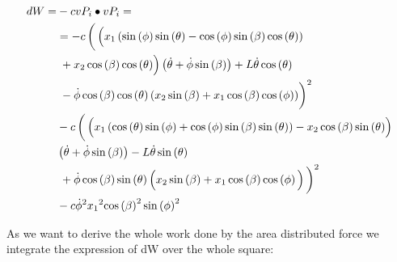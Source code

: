\begin{equation}
    \begin{split}
        dW = &-cvP_i\bullet vP_i = \\
        &= -c\left(\vphantom{\int}\left(\vphantom{\sum}x_{1}\left(\sin\left(\phi \right)\sin\left(\theta \right)-\cos\left(\phi \right)\sin\left(\beta \right)\cos\left(\theta \right)\right)\right.\right.\\
        &\left.\vphantom{\sum}+x_{2}\cos\left(\beta \right)\cos\left(\theta \right)\right)\left(\mathrm{\dot\theta}+\mathrm{\dot\phi}\sin\left(\beta \right)\right)+L\mathrm{\dot\theta}\cos\left(\theta \right)\\
        &\left.\vphantom{\int}-\mathrm{\dot\phi}\cos\left(\beta \right)\cos\left(\theta \right)\left(x_{2}\sin\left(\beta \right)+x_{1}\cos\left(\beta \right)\cos\left(\phi \right)\right)\right)^2\\
        &-c\left(\vphantom{\int}\left(\vphantom{\sum}x_{1}\left(\cos\left(\theta \right)\sin\left(\phi \right)+\cos\left(\phi \right)\sin\left(\beta \right)\sin\left(\theta \right)\right)-x_{2}\cos\left(\beta \right)\sin\left(\theta \right)\right)\right.\\
&\left(\mathrm{\dot\theta}+\mathrm{\dot\phi}\sin\left(\beta \right)\right)-L\mathrm{\dot\theta}\sin\left(\theta \right)\\
&\left.\vphantom{\sum}+\mathrm{\dot\phi}\cos\left(\beta \right)\sin\left(\theta \right)\left(x_{2}\sin\left(\beta \right)+x_{1}\cos\left(\beta \right)\cos\left(\phi \right)\vphantom{\sum}\right)\vphantom{\int}\right)^2\\
&-c{\mathrm{\dot\phi}}^2{x_{1}}^2{\cos\left(\beta \right)}^2\sin\left(\phi \right)^2
    \end{split}
\end{equation}

As we want to derive the whole work done by the area distributed force we integrate the expression of dW over the whole square:

